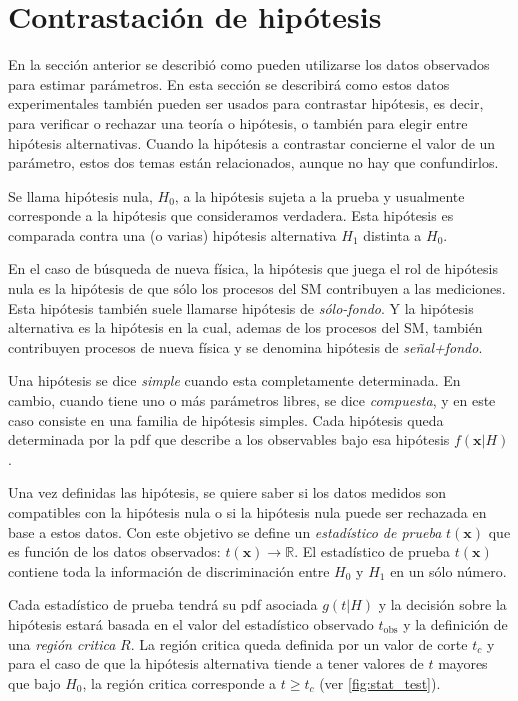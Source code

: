 \section{Contrastación de hipótesis}
\label{sec:testhypo}

En la sección anterior se describió como pueden utilizarse los datos observados
para estimar parámetros. En esta sección se describirá como estos datos
experimentales también pueden ser usados para contrastar hipótesis, es decir,
para verificar o rechazar una teoría o hipótesis, o también para elegir entre
hipótesis alternativas. Cuando la hipótesis a contrastar concierne el valor de
un parámetro, estos dos temas están relacionados, aunque no hay que confundirlos.

Se llama hipótesis nula, $H_0$, a la hipótesis sujeta a la prueba y usualmente
corresponde a la hipótesis que consideramos verdadera. Esta hipótesis es
comparada contra una (o varias) hipótesis alternativa $H_1$ distinta a $H_0$.

En el caso de búsqueda de nueva física, la hipótesis que juega el rol de
hipótesis nula es la hipótesis de que sólo los procesos del SM contribuyen a las
mediciones. Esta hipótesis también suele llamarse hipótesis de
\emph{sólo-fondo}. Y la hipótesis alternativa es la hipótesis en la cual, ademas
de los procesos del SM, también contribuyen procesos de nueva física y se
denomina hipótesis de \emph{se\~nal+fondo}.

Una hipótesis se dice \emph{simple} cuando esta completamente determinada. En
cambio, cuando tiene uno o más parámetros libres, se dice \emph{compuesta}, y
en este caso consiste en una familia de hipótesis simples. Cada hipótesis queda
determinada por la pdf que describe a los observables bajo esa hipótesis
$f(\bm{x}|H)$.

Una vez definidas las hipótesis, se quiere saber si los datos medidos son
compatibles con la hipótesis nula o si la hipótesis nula puede ser rechazada en
base a estos datos. Con este objetivo se define un \emph{estadístico de prueba}
$t(\bm{x})$ que es función de los datos observados: $t(\bm{x}) \to \mathbb{R}$.
El estadístico de prueba $t(\bm{x})$ contiene toda la información de
discriminación entre $H_0$ y $H_1$ en un sólo número.

Cada estadístico de prueba tendrá su pdf asociada $g(t|H)$ y la decisión sobre
la hipótesis estará basada en el valor del estadístico observado $t_\text{obs}$
y la definición de una \emph{región critica} $R$. La región critica queda
definida por un valor de corte $t_c$ y para el caso de que la hipótesis
alternativa tiende a tener valores de $t$ mayores que bajo $H_0$, la región
critica corresponde a $t \geq t_c$ (ver \cref{fig:stat_test}).

